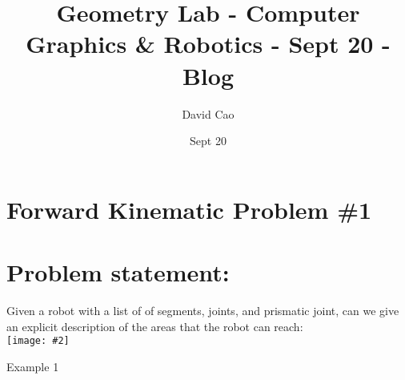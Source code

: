 \documentclass[11pt]{article}
\title{Geometry Lab - Computer Graphics \& Robotics - Sept 20 - Blog}
\author{David Cao}
\date{Sept 20}
\newcommand{\image}[2]{\texttt{[image: \#2]}}
\begin{document}
\maketitle

\section*{Forward Kinematic Problem \#1}
\section{Problem statement:}
Given a robot with a list of of segments, joints, and prismatic joint, can we give an explicit description of the areas that the robot can reach:
\vspace{3em} \\
\image{0.75}{img1}\\
\begin{center}
  Example 1
\end{center}
\end{document}
